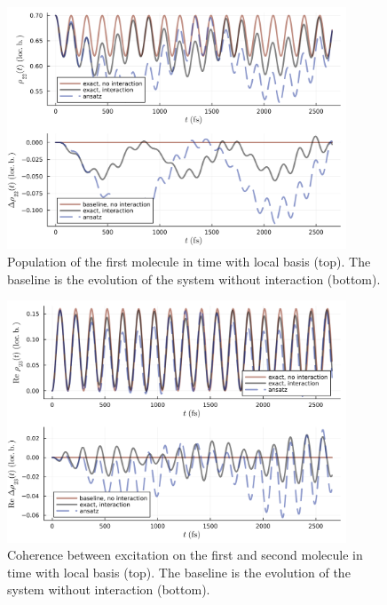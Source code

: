 \begin{figure}[H]
\centering
\includegraphics[width=0.9\textwidth]{img/explain_graphs/explain_graphs_joined_schloc22.png}
\caption{Population of the first molecule in time with local basis (top). The baseline is the evolution of the system without interaction (bottom).}
\label{img:explain_graphs_joined_schloc22}
\end{figure}

\begin{figure}[H]
\centering
\includegraphics[width=0.9\textwidth]{img/explain_graphs/explain_graphs_joined_schloc23.png}
\caption{Coherence between excitation on the first and second molecule in time with  local basis (top). The baseline is the evolution of the system without interaction (bottom).}
\label{img:explain_graphs_joined_schloc23}
\end{figure}

